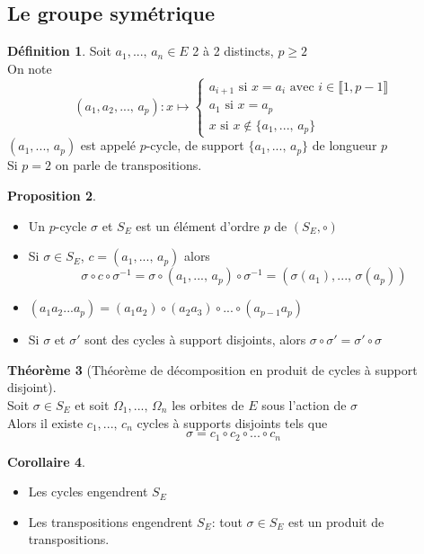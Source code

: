 \documentclass[10pt,a4paper]{article}
\theoremstyle{definition}
\newtheorem{proposition}{Proposition}[section]
\newtheorem{theorem}[proposition]{Théorème}
\newtheorem{corollaire}[proposition]{Corollaire}
\newtheorem{definition}[proposition]{Définition}
\begin{document}
\subsection{Le groupe symétrique}
\begin{definition}
Soit $a_1, ...,\, a_n \in E$ 2 à 2 distincts, $p \geq 2$ \\
On note \[(a_1, a_2, ...,\, a_p): x \mapsto \begin{cases}
a_{i + 1} \text{ si } x = a_i \text{ avec } i \in \llbracket 1, p - 1 \rrbracket \\
a_1 \text{ si } x = a_p \\
x \text{ si } x \not\in \{ a_1, ...,\, a_p \}
\end{cases} \]
$(a_1, ...,\, a_p)$ est appelé $p$-cycle, de support $\{ a_1, ...,\, a_p \}$ de longueur $p$ \\
Si $p = 2$ on parle de transpositions.
\end{definition}
\begin{proposition}
\hfill
\begin{itemize}
\item Un $p$-cycle $\sigma$ et $S_E$ est un élément d'ordre $p$ de $(S_E, \circ)$
\item Si $\sigma \in S_E$, $c = (a_1, ...,\, a_p)$ alors
\[ \sigma \circ c \circ \sigma^{-1} = \sigma \circ (a_1, ...,\, a_p) \circ \sigma^{-1} = (\sigma(a_1), ...,\, \sigma(a_p)) \]
\item $(a_1 a_2 ... a_p) = (a_1 a_2) \circ (a_2 a_3) \circ ... \circ (a_{p - 1} a_p)$
\item Si $\sigma$ et $\sigma'$ sont des cycles à support disjoints, alors $\sigma \circ \sigma' = \sigma' \circ \sigma$ 
\end{itemize}
\end{proposition}
\begin{theorem}[Théorème de décomposition en produit de cycles à support disjoint]
\hfill \\
Soit $\sigma \in S_E$ et soit $\Omega_1, ...,\, \Omega_n$ les orbites de $E$ sous l'action de $\sigma$ \\
Alors il existe $c_1, ...,\, c_n$ cycles à supports disjoints tels que
\[ \sigma = c_1 \circ c_2 \circ ... \circ c_n \]
\end{theorem}
\begin{corollaire}
\hfill \begin{itemize}
\item Les cycles engendrent $S_E$
\item Les transpositions engendrent $S_E$: tout $\sigma \in S_E$ est un produit de transpositions.
\end{itemize}
\end{corollaire}
\end{document}
